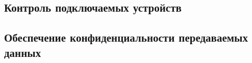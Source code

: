 \subsection{Контроль подключаемых устройств} %

\subsection{Обеспечение конфиденциальности передаваемых данных} %



